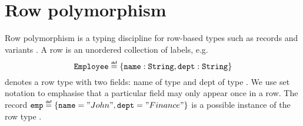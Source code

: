 \section{Row polymorphism}\label{sec:rowpolymorphism}
Row polymorphism is a typing discipline for row-based types such as records and variants \cite{Remy1993}. A row is an unordered collection of labels, e.g. 
\[ \type{Employee} \defas \record{\code{name}:\type{String},\code{dept}:\type{String}} \]
denotes a row type with two fields: name of type  and dept of type . We use set notation to emphasise that a particular field may only appear once in a row. The record $\code{emp} \defas \record{\code{name}="John", \code{dept}="Finance"}$ is a possible instance of the row type . 

